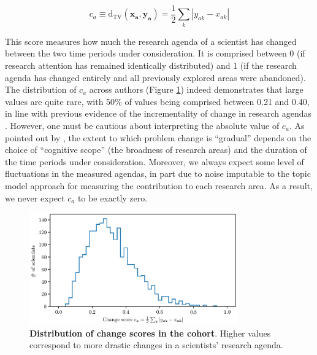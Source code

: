 \documentclass{article}
\begin{document}
\begin{equation}
    c_a \equiv \mathrm{d}_{\text{TV}}(\bm{x_a},\bm{y_a}) = \frac{1}{2} \sum_k |y_{ak}-x_{ak}|
\end{equation}

This score measures how much the research agenda of a scientist has changed between the two time periods under consideration. It is comprised between 0 (if research attention has remained identically distributed) and 1 (if the research agenda has changed entirely and all previously explored areas were abandoned). The distribution of $c_a$ across authors (Figure \ref{fig:change_scores}) indeed demonstrates that large values are quite rare, with 50\% of values being comprised between 0.21 and 0.40, in line with previous evidence of the incrementality of change in research agendas \citep{Gieryn1978,Jia2017,Aleta2019}. However, one must be cautious about interpreting the absolute value of $c_a$. As pointed out by \citet{Gieryn1978}, the extent to which problem change is ``gradual'' depends on the choice of ``cognitive scope'' (the broadness of research areas) and the duration of the time periods under consideration.  Moreover, we always expect some level of fluctuations in the measured agendas, in part due to noise imputable to the topic model approach for measuring the contribution to each research area. As a result, we never expect $c_a$ to be exactly zero.

\begin{figure}[h]
    \centering
        \includegraphics[width=0.8\textwidth]{plots/change_score.eps}
    \caption{\textbf{Distribution of change scores in the cohort}. Higher values correspond to more drastic changes in a scientists' research agenda.}    
    \label{fig:change_scores}
\end{figure}
\end{document}
